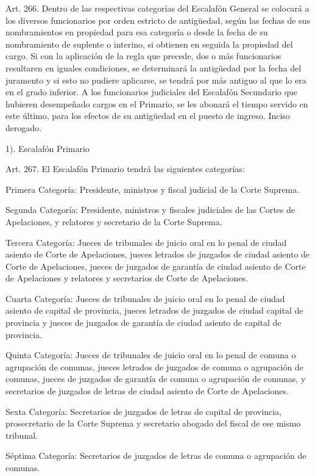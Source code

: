     Art. 266. Dentro de las respectivas categorías del Escalafón General se colocará a los diversos funcionarios por orden estricto de antigüedad, según las fechas de sus nombramientos en propiedad para esa categoría o desde la fecha de su nombramiento de suplente o interino, si obtienen en seguida la propiedad del cargo. Si con la aplicación de la regla que precede, dos o más funcionarios resultaren en iguales condiciones, se determinará la antigüedad por la fecha del juramento y si esto no pudiere aplicarse, se tendrá por más antiguo al que lo era en el grado inferior.
    A los funcionarios judiciales del Escalafón Secundario que hubieren desempeñado cargos en el Primario, se les abonará el tiempo servido en este último, para los efectos de su antigüedad en el puesto de ingreso.
    Inciso derogado.



    1). Escalafón Primario


    Art. 267. El Escalafón Primario tendrá las siguientes categorías:

    Primera Categoría: Presidente, ministros y fiscal judicial de la Corte Suprema.

    Segunda Categoría: Presidente, ministros y fiscales judiciales de las Cortes de Apelaciones, y relatores y secretario de la Corte Suprema.

    Tercera Categoría: Jueces de tribunales de juicio oral en lo penal de ciudad asiento de Corte de Apelaciones, jueces letrados de juzgados de ciudad asiento de Corte de Apelaciones, jueces de juzgados de garantía de ciudad asiento de Corte de Apelaciones y relatores y secretarios de Corte de Apelaciones.

    Cuarta Categoría: Jueces de tribunales de juicio oral en lo penal de ciudad asiento de capital de provincia, jueces letrados de juzgados de ciudad capital de provincia y jueces de juzgados de garantía de ciudad asiento de capital de provincia.

    Quinta Categoría: Jueces de tribunales de juicio oral en lo penal de comuna o agrupación de comunas, jueces letrados de juzgados de comuna o agrupación de comunas, jueces de juzgados de garantía de comuna o agrupación de comunas, y secretarios de juzgados de letras de ciudad asiento de Corte de Apelaciones.

    Sexta Categoría: Secretarios de juzgados de letras de capital de provincia, prosecretario de la Corte Suprema y secretario abogado del fiscal de ese mismo tribunal.

    Séptima Categoría: Secretarios de juzgados de letras de comuna o agrupación de comunas.

